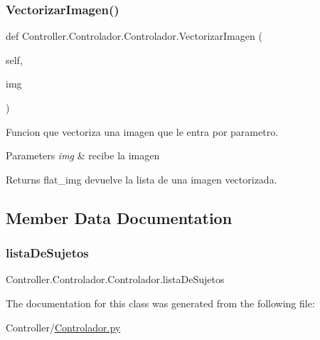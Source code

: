 \subsubsection{\texorpdfstring{Vectorizar\+Imagen()}{VectorizarImagen()}}
{\footnotesize\ttfamily def Controller.\+Controlador.\+Controlador.\+Vectorizar\+Imagen (\begin{DoxyParamCaption}\item[{}]{self,  }\item[{}]{img }\end{DoxyParamCaption})}



Funcion que vectoriza una imagen que le entra por parametro. 


\begin{DoxyParams}{Parameters}
{\em img} & recibe la imagen \\
\hline
\end{DoxyParams}
\begin{DoxyReturn}{Returns}
flat\+\_\+img devuelve la lista de una imagen vectorizada. 
\end{DoxyReturn}


\subsection{Member Data Documentation}
\mbox{\label{class_controller_1_1_controlador_1_1_controlador_ac7f14b4e1c0f2bf39ef0ddf2ae687898}} 
\subsubsection{\texorpdfstring{lista\+De\+Sujetos}{listaDeSujetos}}
{\footnotesize\ttfamily Controller.\+Controlador.\+Controlador.\+lista\+De\+Sujetos}



The documentation for this class was generated from the following file\+:\begin{DoxyCompactItemize}
\item 
Controller/\hyperlink{_controlador_8py}{Controlador.\+py}\end{DoxyCompactItemize}
